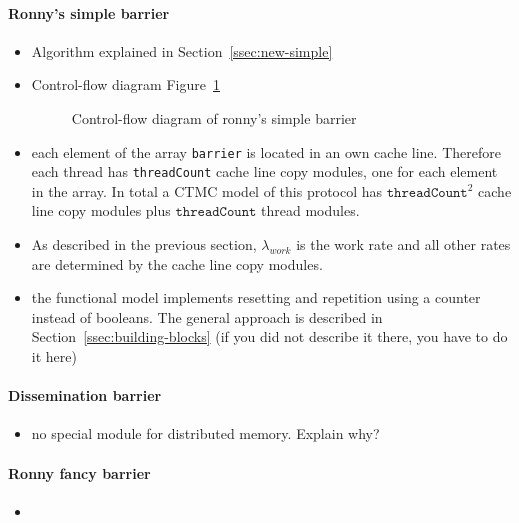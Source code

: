 \documentclass[a4paper, 10pt]{article}
\begin{document}
\begin{enumerate}
\paragraph{Ronny's simple barrier}
\label{ssssec:analysis-modelchecking-modelling-ronny-simple}
\begin{itemize}
	\item Algorithm explained in Section~\ref{ssec:new-simple}
	\item Control-flow diagram Figure~\ref{fig:ronny-simple-control-flow}
		\begin{figure}[htbp]
			\centering
			
			\caption{Control-flow diagram of ronny's simple barrier}
			\label{fig:ronny-simple-control-flow}
		\end{figure}
	\item each element of the array \texttt{barrier} is located in an own cache line. Therefore each thread has \texttt{threadCount} cache line copy modules, one for each element in the array. In total a CTMC model of this protocol has $\mathtt{threadCount}^2$ cache line copy modules plus $\mathtt{threadCount}$ thread modules.
	\item As described in the previous section, $\lambda_{work}$ is the work rate and all other rates are determined by the cache line copy modules.
	\item the functional model implements resetting and repetition using a counter instead of booleans. The general approach is described in Section~\ref{ssec:building-blocks} (if you did not describe it there, you have to do it here)
\end{itemize}

\paragraph{Dissemination barrier}
\label{ssssec:analysis-modelchecking-modelling-dissemination}
\begin{itemize}
	\item no special module for distributed memory. Explain why?
\end{itemize}

\paragraph{Ronny fancy barrier}
\label{ssssec:analysis-modelchecking-modelling-ronny-fancy}
\begin{itemize}
	\item 
\end{itemize}


\end{enumerate}
\end{document}
